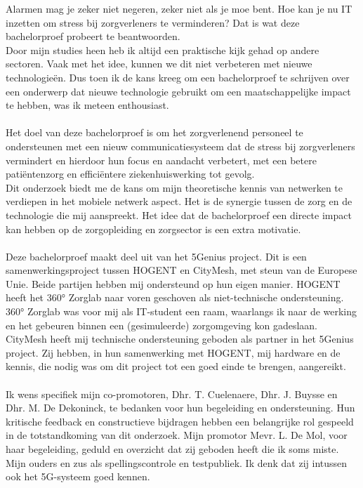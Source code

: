 Alarmen mag je zeker niet negeren, zeker niet als je moe bent. Hoe kan je nu IT inzetten om stress bij zorgverleners te verminderen? Dat is wat deze bachelorproef probeert te beantwoorden.
\\
Door mijn studies heen heb ik altijd een praktische kijk gehad op andere sectoren. Vaak met het idee, kunnen we dit niet verbeteren met nieuwe technologieën. Dus toen ik de kans kreeg om een bachelorproef te schrijven over een onderwerp dat nieuwe technologie gebruikt om een maatschappelijke impact te hebben, was ik meteen enthousiast.
\\\\
Het doel van deze bachelorproef is om het zorgverlenend personeel te ondersteunen met een nieuw communicatiesysteem dat de stress bij zorgverleners vermindert en hierdoor hun focus en aandacht verbetert, met een betere patiëntenzorg en efficiëntere ziekenhuiswerking tot gevolg.
\\
Dit onderzoek biedt me de kans om mijn theoretische kennis van netwerken te verdiepen in het mobiele netwerk aspect. Het is de synergie tussen de zorg en de technologie die mij aanspreekt. Het idee dat de bachelorproef een directe impact kan hebben op de zorgopleiding en zorgsector is een extra motivatie.
\\\\
Deze bachelorproef maakt deel uit van het 5Genius project. Dit is een samenwerkingsproject tussen HOGENT en CityMesh, met steun van de Europese Unie. Beide partijen hebben mij ondersteund op hun eigen manier. HOGENT heeft het 360° Zorglab naar voren geschoven als niet-technische ondersteuning. 360° Zorglab was voor mij als IT-student een raam, waarlangs ik naar de werking en het gebeuren binnen een (gesimuleerde) zorgomgeving kon gadeslaan. CityMesh heeft mij technische ondersteuning geboden als partner in het 5Genius project. Zij hebben, in hun samenwerking met HOGENT, mij hardware en de kennis, die nodig was om dit project tot een goed einde te brengen, aangereikt.
\\\\
Ik wens specifiek mijn co-promotoren, Dhr. T. Cuelenaere, Dhr. J. Buysse en Dhr. M. De Dekoninck, te bedanken voor hun begeleiding en ondersteuning. Hun kritische feedback en constructieve bijdragen hebben een belangrijke rol gespeeld in de totstandkoming van dit onderzoek. Mijn promotor Mevr. L. De Mol, voor haar begeleiding, geduld en overzicht dat zij geboden heeft die ik soms miste.
Mijn ouders en zus als spellingscontrole en testpubliek. Ik denk dat zij intussen ook het 5G-systeem goed kennen.

